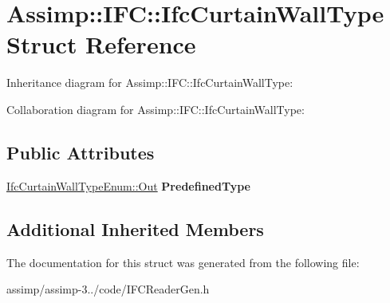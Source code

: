 \hypertarget{struct_assimp_1_1_i_f_c_1_1_ifc_curtain_wall_type}{\section{Assimp\+:\+:I\+F\+C\+:\+:Ifc\+Curtain\+Wall\+Type Struct Reference}
\label{struct_assimp_1_1_i_f_c_1_1_ifc_curtain_wall_type}
}


Inheritance diagram for Assimp\+:\+:I\+F\+C\+:\+:Ifc\+Curtain\+Wall\+Type\+:


Collaboration diagram for Assimp\+:\+:I\+F\+C\+:\+:Ifc\+Curtain\+Wall\+Type\+:
\subsection*{Public Attributes}
\begin{DoxyCompactItemize}
\item 
\hypertarget{struct_assimp_1_1_i_f_c_1_1_ifc_curtain_wall_type_aa8d78e8257fd740587664730b3f6086c}{\hyperlink{classboost_1_1shared__ptr}{Ifc\+Curtain\+Wall\+Type\+Enum\+::\+Out} {\bfseries Predefined\+Type}}\label{struct_assimp_1_1_i_f_c_1_1_ifc_curtain_wall_type_aa8d78e8257fd740587664730b3f6086c}

\end{DoxyCompactItemize}
\subsection*{Additional Inherited Members}


The documentation for this struct was generated from the following file\+:\begin{DoxyCompactItemize}
\item 
assimp/assimp-\/3../code/I\+F\+C\+Reader\+Gen.\+h\end{DoxyCompactItemize}
